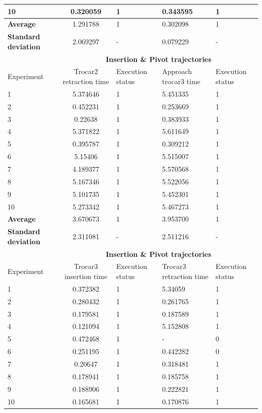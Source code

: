 \begin{longtable}{|p{2cm}|c|p{2cm}|p{2cm}|p{2cm}|}
10  & 0.320059	& 1	& 0.343595	& 1 \\
\hline
\textbf{Average} & 1.291788	& 1	& 0.302098	& 1 \\
\hline
\textbf{Standard deviation} & 	2.069297 &	- &	0.079229 & - \\
\hline
                          & \multicolumn{4}{c}{\textbf{Insertion \& Pivot trajectories}}                     \vline \\
\hline
Experiment                & Trocar2 retraction time & Execution status & Approach trocar3 time & Execution status  \\
\hline
1 & 5.374646	& 1	& 5.451335	& 1 \\
2 & 0.452231	& 1	& 0.253669	& 1 \\
3 & 0.22638	& 1	& 0.383933	& 1 \\
4 & 5.371822	& 1	& 5.611649	& 1 \\
5 & 0.395787	& 1	& 0.309212	& 1 \\
6 & 5.15406	& 1	& 5.515007	& 1 \\
7 & 4.189377	& 1	& 5.570568	& 1 \\
8 & 5.167346	& 1	& 5.522056	& 1 \\
9 & 5.101735	& 1	& 5.452301	& 1 \\
10  & 5.273342	& 1	& 5.467273	& 1 \\
\hline
\textbf{Average} & 3.670673	& 1	& 3.953700	& 1 \\
\hline
\textbf{Standard deviation} & 	2.311081 &	- &	2.511216 & - \\
\hline
                          & \multicolumn{4}{c}{\textbf{Insertion \& Pivot trajectories}}                     \vline \\
\hline
Experiment                & Trocar3 insertion time & Execution status & Trocar3 retraction time & Execution status  \\
\hline
1 & 0.372382	& 1	& 5.34059	& 1 \\
2 & 0.280432	& 1	& 0.261765	& 1 \\
3 & 0.179581	& 1	& 0.187589	& 1 \\
4 & 0.121094	& 1	& 5.152808	& 1 \\
5 & 0.472468	& 1	& -	& 0 \\
6 & 0.251195	& 1	& 0.442282	& 0 \\
7 & 0.20647	& 1	& 0.318481	& 1 \\
8 & 0.178941	& 1	& 0.185758	& 1 \\
9 & 0.188906	& 1	& 0.222821	& 1 \\
10  & 0.165681	& 1	& 0.170876	& 1 \\

\end{longtable}

